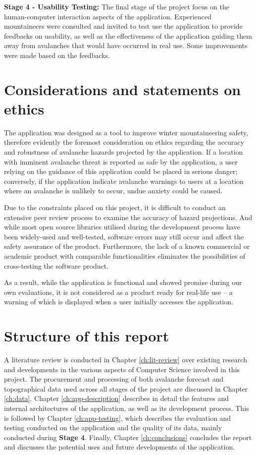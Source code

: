 \documentclass[openany]{UoYCSproject}
\begin{document}
\textbf{Stage 4 - Usability Testing:} The final stage of the project focus on the human-computer interaction aspects of the application. Experienced mountaineers were consulted and invited to test use the application to provide feedbacks on usability, as well as the effectiveness of the application guiding them away from avalanches that would have occurred in real use. Some improvements were made based on the feedbacks.

\section{Considerations and statements on ethics}

The application was designed as a tool to improve winter mountaineering safety, therefore evidently the foremost consideration on ethics regarding the accuracy and robustness of avalanche hazards projected by the application. If a location with imminent avalanche threat is reported as safe by the application, a user relying on the guidance of this application could be placed in serious danger; conversely, if the application indicate avalanche warnings to users at a location where an avalanche is unlikely to occur, undue anxiety could be caused.

Due to the constraints placed on this project, it is difficult to conduct an extensive peer review process to examine the accuracy of hazard projections. And while most open source libraries utilised during the development process have been widely-used and well-tested, software errors may still occur and affect the safety assurance of the product. Furthermore, the lack of a known commercial or academic product with comparable functionalities eliminates the possibilities of cross-testing the software product.

As a result, while the application is functional and showed promise during our own evaluations, it is not considered as a product ready for real-life use -- a warning of which is displayed when a user initially accesses the application.

\section{Structure of this report}

A literature review is conducted in Chapter \ref{ch:lit-review} over existing research and developments in the various aspects of Computer Science involved in this project. The procurement and processing of both avalanche forecast and topographical data used across all stages of the project are discussed in Chapter \ref{ch:data}. Chapter \ref{ch:app-description} describes in detail the features and internal architectures of the application, as well as its development process. This is followed by Chapter \ref{ch:app-testing}, which describes the evaluation and testing conducted on the application and the quality of its data, mainly conducted during \textbf{Stage 4}. Finally, Chapter \ref{ch:conclusions} concludes the report and discusses the potential uses and future developments of the application.
\end{document}
